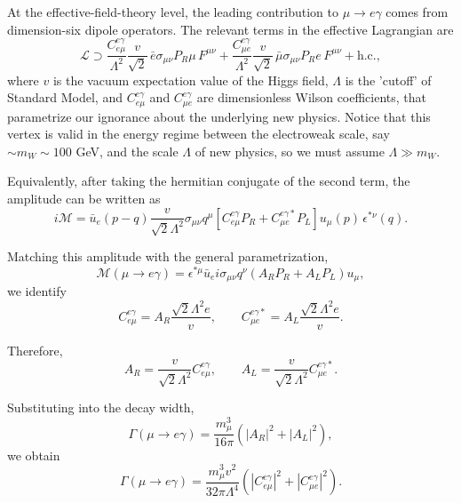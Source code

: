 \documentclass[11pt]{article}
\begin{document}
At the effective-field-theory level, the leading contribution to $\mu \to e\gamma$ comes from dimension-six dipole operators. The relevant terms in the effective Lagrangian are
\begin{equation}
    \mathcal{L}
    \supset
    \frac{C^{e\gamma}_{e\mu}}{\Lambda^2}
    \frac{v}{\sqrt{2}}\,
    \bar{e}\sigma_{\mu\nu}P_R\mu\,F^{\mu\nu}
    +
    \frac{C^{e\gamma}_{\mu e}}{\Lambda^2}
    \frac{v}{\sqrt{2}}\,
    \bar{\mu}\sigma_{\mu\nu}P_R e\,F^{\mu\nu}
    + \text{h.c.},
\end{equation}
where $v$ is the vacuum expectation value of the Higgs field, $\Lambda$ is the 'cutoff' of Standard Model, and $C^{e\gamma}_{e\mu}$ and $C^{e\gamma}_{\mu e}$ are dimensionless Wilson coefficients, that parametrize our ignorance about the underlying new physics. Notice that this vertex is valid in the energy regime between the electroweak scale, say $\sim m_W \sim 100$ GeV, and the scale $\Lambda$ of new physics, so we must assume $\Lambda \gg m_W$.

Equivalently, after taking the hermitian conjugate of the second term, the amplitude can be written as
\begin{equation}
    i\mathcal{M}
    =
    \bar{u}_e(p-q)
    \frac{v}{\sqrt{2}\Lambda^2}
    \sigma_{\mu\nu}q^\mu
    \left[
        C^{e\gamma}_{e\mu}P_R
        +
        C^{e\gamma *}_{\mu e}P_L
    \right]
    u_\mu(p)\,
    \epsilon^{*\nu}(q).
\end{equation}

Matching this amplitude with the general parametrization,
\begin{equation}
    \mathcal{M}(\mu \to e\gamma)
    =
    \epsilon^{*\mu}
    \bar{u}_e i\sigma_{\mu\nu}q^\nu
    \left(
        A_RP_R+A_LP_L
    \right)
    u_\mu,
\end{equation}
we identify
\begin{equation}
    C^{e\gamma}_{e\mu}
    =
    A_R \frac{\sqrt{2}\Lambda^2 e}{v},
    \qquad
    C^{e\gamma *}_{\mu e}
    =
    A_L \frac{\sqrt{2}\Lambda^2 e}{v}.
\end{equation}

Therefore,
\begin{equation}
    A_R =
    \frac{v}{\sqrt{2}\Lambda^2}
    C^{e\gamma}_{e\mu},
    \qquad
    A_L =
    \frac{v}{\sqrt{2}\Lambda^2}
    C^{e\gamma *}_{\mu e}.
\end{equation}

Substituting into the decay width,
\begin{equation}
    \Gamma(\mu \to e\gamma)
    =
    \frac{m_\mu^3 }{16\pi}
    \left(
        |A_R|^2+|A_L|^2
    \right),
\end{equation}
we obtain
\begin{equation}
    \Gamma(\mu \to e\gamma)
    =
    \frac{m_\mu^3 v^2}{32\pi\Lambda^4}
    \left(
        |C^{e\gamma}_{e\mu}|^2
        +
        |C^{e\gamma}_{\mu e}|^2
    \right).
\end{equation}
\end{document}
